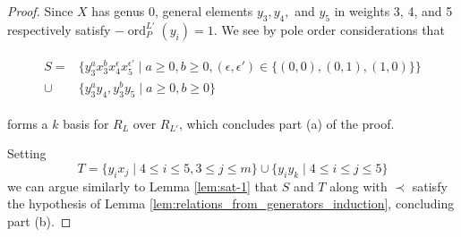 \documentclass{amsart}
\theoremstyle{plain}
\theoremstyle{definition}
\theoremstyle{remark}
\numberwithin{equation}{section}
\DeclareMathOperator{\ord}{ord}
\newcommand{\halfcan}{L}
\DeclareMathOperator{\initial}{in_\prec}
\begin{document}
\begin{proof}
Since $X$ has genus 0, general
elements $y_3, y_4,$ and $y_5$ in weights 3, 4, and 5 respectively satisfy $-\ord_P^{\halfcan'}(y_i) =
1$. We see by pole order considerations that

\begin{align}
\label{eqn:add_one_generator}
	\begin{split}
		S=	&\{ y_3^ax_3^b x_4^\epsilon x_5^{\epsilon'} \mid a \geq 0, b 
		\geq 0,(\epsilon, \epsilon') \in \{(0,0),(0,1),(1,0)\} \} \\
		\cup \;&\{y_3^ay_4, y_3^by_5 \mid a \geq 0, b \geq 0 \}
	\end{split}
\end{align}

\noindent forms a $k$ basis for $R_\halfcan$ over $R_{\halfcan'}$, which concludes part (a) of the proof.

Setting
\[
	T = \{ y_i x_j \mid 4 \leq i \leq 5, 3 \leq j \leq m\} \cup \{ y_i y_k \mid 4 \leq i \leq j \leq 5\} 
\]
we can argue similarly to Lemma \ref{lem:sat-1} that $S$ and $T$ along with $\prec$ satisfy the hypothesis of Lemma \ref{lem:relations_from_generators_induction}, concluding part (b).



%
%
%
%
%
%


\end{proof}
\end{document}

